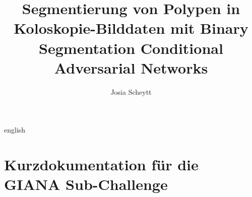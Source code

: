 

\title{Segmentierung von Polypen in Koloskopie-Bilddaten mit Binary Segmentation Conditional Adversarial Networks}
\author{Josia Scheytt}






\tableofcontents

\clearpage
{}
\begin{abstract}
	
\end{abstract}

\clearpage
{}
\begin{otherlanguage*}{english}
\begin{abstract}
	
\end{abstract}
\end{otherlanguage*}









\listoffigures
\listoftables
\printglossary[type=\acronymtype,title={Abkürzungsverzeichnis}]
\printbibliography[heading=bibintoc]

\appendix
\chapter{Kurzdokumentation für die GIANA Sub-Challenge}





